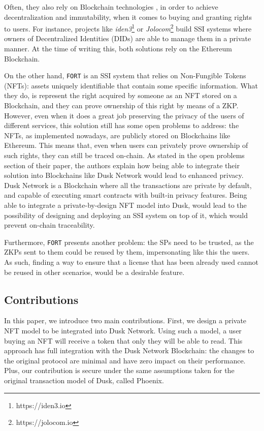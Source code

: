 Often, they also rely on Blockchain technologies \cite{blockchain2}, in order to achieve decentralization and immutability, when it comes to buying and granting rights to users. For instance, projects like \textit{iden3}\footnote{https://iden3.io} or \textit{Jolocom}\footnote{https://jolocom.io} build SSI systems where owners of Decentralized Identities (DIDs) are able to manage them in a private manner. At the time of writing this, both solutions rely on the Ethereum Blockchain.

On the other hand, \verb!FORT! \cite{math10040617} is an SSI system that relies on Non-Fungible Tokens (NFTs): assets uniquely identifiable that contain some specific information. What they do, is represent the right acquired by someone as an NFT stored on a Blockchain, and they can prove ownership of this right by means of a ZKP. However, even when it does a great job preserving the privacy of the users of different services, this solution still has some open problems to address: the NFTs, as implemented nowadays, are publicly stored on Blockchains like Ethereum. This means that, even when users can privately prove ownership of such rights, they can still be traced on-chain. As stated in the open problems section of their paper, the authors explain how being able to integrate their solution into Blockchains like Dusk Network would lead to enhanced privacy. Dusk Network is a Blockchain where all the transactions are private by default, and capable of executing smart contracts with built-in privacy features. Being able to integrate a private-by-design NFT model into Dusk, would lead to the possibility of designing and deploying an SSI system on top of it, which would prevent on-chain traceability.

Furthermore, \verb!FORT! presents another problem: the SPs need to be trusted, as the ZKPs sent to them could be reused by them, impersonating like this the users. As such, finding a way to ensure that a license that has been already used cannot be reused in other scenarios, would be a desirable feature.

\subsection{Contributions} 

In this paper, we introduce two main contributions. First, we design a private NFT model to be integrated into Dusk Network. Using such a model, a user buying an NFT will receive a token that only they will be able to read. This approach has full integration with the Dusk Network Blockchain: the changes to the original protocol are minimal and have zero impact on their performance. Plus, our contribution is secure under the same assumptions taken for the original transaction model of Dusk, called Phoenix.

